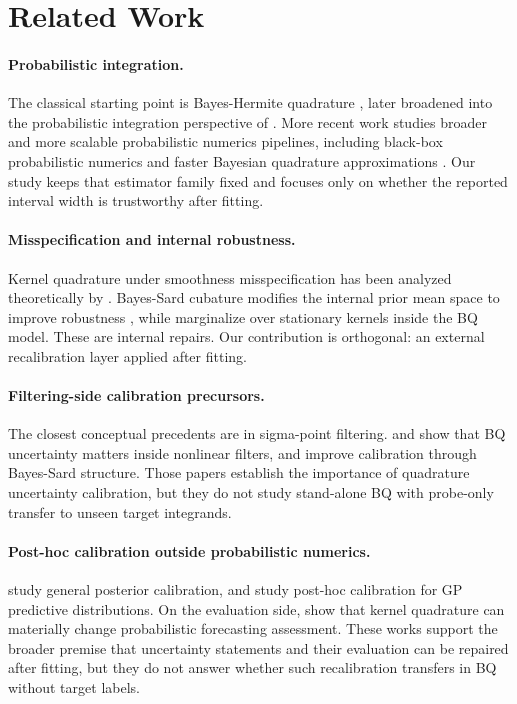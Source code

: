 \documentclass{article}
\begin{document}
\section{Related Work}
\label{sec:related}
\paragraph{Probabilistic integration.}
The classical starting point is Bayes-Hermite quadrature \citep{ohagan1991bayes}, later broadened into the probabilistic integration perspective of \citet{briol2019probabilistic}. More recent work studies broader and more scalable probabilistic numerics pipelines, including black-box probabilistic numerics \citep{teymur2021black} and faster Bayesian quadrature approximations \citep{warren2024fast}. Our study keeps that estimator family fixed and focuses only on whether the reported interval width is trustworthy after fitting.

\paragraph{Misspecification and internal robustness.}
Kernel quadrature under smoothness misspecification has been analyzed theoretically by \citet{kanagawa2018convergence}. Bayes-Sard cubature modifies the internal prior mean space to improve robustness \citep{karvonen2018bayes}, while \citet{hamid22a} marginalize over stationary kernels inside the BQ model. These are internal repairs. Our contribution is orthogonal: an external recalibration layer applied after fitting.

\paragraph{Filtering-side calibration precursors.}
The closest conceptual precedents are in sigma-point filtering. \citet{pruher2015nonlinear} and \citet{pruher2016variance} show that BQ uncertainty matters inside nonlinear filters, and \citet{pruher2021improved} improve calibration through Bayes-Sard structure. Those papers establish the importance of quadrature uncertainty calibration, but they do not study stand-alone BQ with probe-only transfer to unseen target integrands.

\paragraph{Post-hoc calibration outside probabilistic numerics.}
\citet{syring2019calibrating} study general posterior calibration, and \citet{pion2025bayesian} study post-hoc calibration for GP predictive distributions. On the evaluation side, \citet{adachi2025fixing} show that kernel quadrature can materially change probabilistic forecasting assessment. These works support the broader premise that uncertainty statements and their evaluation can be repaired after fitting, but they do not answer whether such recalibration transfers in BQ without target labels.
\end{document}
